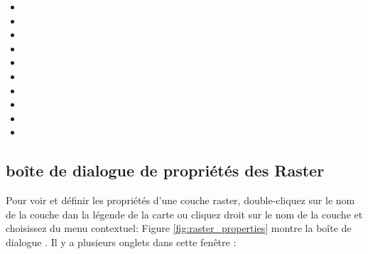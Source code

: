 \begin{itemize}
\item {}
\item {}
\item {}
\item {}
\item {}
\item {}
\item {}
\item {}
\item {}
\item {}
\end{itemize}

\subsection{boîte de dialogue de propriétés des Raster}\label{label_rasterprop}

Pour voir et définir les propriétés d'une couche raster, double-cliquez sur le
nom de la couche dan la légende de la carte ou cliquez droit sur le nom de
la couche et choisissez  du menu
contextuel:  Figure
\ref{fig:raster_properties} montre la boîte de dialogue . Il y a plusieurs onglets dans cette fenêtre :

